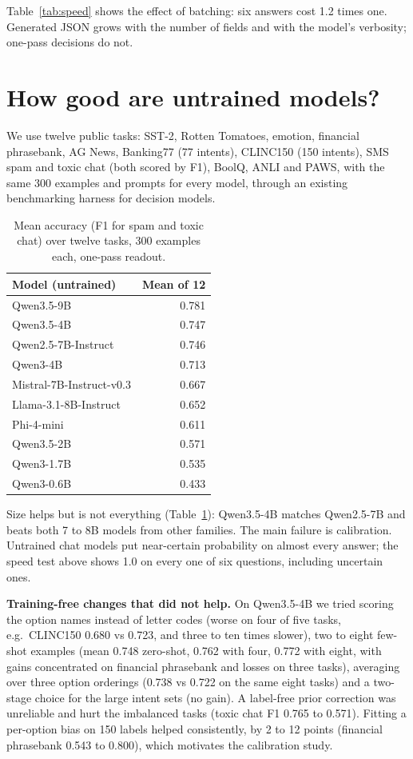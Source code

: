 \documentclass[10pt,twocolumn]{article}
\begin{document}
Table~\ref{tab:speed} shows the effect of batching: six answers cost 1.2 times one. Generated JSON grows with the
number of fields and with the model's verbosity; one-pass decisions do not.

\section{How good are untrained models?}

We use twelve public tasks: SST-2, Rotten Tomatoes, emotion, financial phrasebank, AG News, Banking77 (77 intents),
CLINC150 (150 intents), SMS spam and toxic chat (both scored by F1), BoolQ, ANLI and PAWS, with the same 300 examples
and prompts for every model, through an existing benchmarking harness for decision models.

\begin{table}[t]
\centering\small
\begin{tabular}{lr}
\toprule
Model (untrained) & Mean of 12 \\
\midrule
Qwen3.5-9B & 0.781 \\
Qwen3.5-4B & 0.747 \\
Qwen2.5-7B-Instruct & 0.746 \\
Qwen3-4B & 0.713 \\
Mistral-7B-Instruct-v0.3 & 0.667 \\
Llama-3.1-8B-Instruct & 0.652 \\
Phi-4-mini & 0.611 \\
Qwen3.5-2B & 0.571 \\
Qwen3-1.7B & 0.535 \\
Qwen3-0.6B & 0.433 \\
\bottomrule
\end{tabular}
\caption{Mean accuracy (F1 for spam and toxic chat) over twelve tasks, 300 examples each, one-pass readout.}
\label{tab:base}
\end{table}

Size helps but is not everything (Table~\ref{tab:base}): Qwen3.5-4B matches Qwen2.5-7B and beats both 7 to 8B models
from other families. The main failure is calibration. Untrained chat models put near-certain probability on almost
every answer; the speed test above shows 1.0 on every one of six questions, including uncertain ones.

\textbf{Training-free changes that did not help.} On Qwen3.5-4B we tried scoring the option names instead of letter
codes (worse on four of five tasks, e.g.\ CLINC150 0.680 vs 0.723, and three to ten times slower), two to eight
few-shot examples (mean 0.748 zero-shot, 0.762 with four, 0.772 with eight, with gains concentrated on financial
phrasebank and losses on three tasks), averaging over three option orderings (0.738 vs 0.722 on the same eight
tasks) and a two-stage choice for the large intent sets (no gain). A label-free prior correction \cite{zhao} was
unreliable and hurt the imbalanced tasks (toxic chat F1 0.765 to 0.571). Fitting a per-option bias on 150 labels
helped consistently, by 2 to 12 points (financial phrasebank 0.543 to 0.800), which motivates the calibration study.
\end{document}
